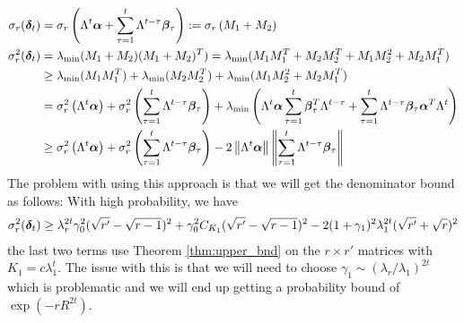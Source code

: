 \documentclass[10pt]{article}
\newcommand{\norm}[1]{\left\|#1\right\|}
\begin{document}
\begin{align*}
\sigma_r(\utcos_t) &= \sigma_r\left(\Lambda^t \ucos + \sum_{\tau=1}^t \Lambda^{t-\tau} \wcos_\tau\right) := \sigma_r\left(M_1 + M_2\right) \\
\sigma_r^2 (\utcos_t)&= \lambda_{\min}(M_1 + M_2)(M_1 + M_2)^T) = \lambda_{\min}(M_1 M_1^T + M_2 M_2^T + M_1 M_2^2 + M_2 M_1^T) \\
&\geq \lambda_{\min}(M_1 M_1^T)  + \lambda_{\min}(M_2 M_2^T) + \lambda_{\min}(M_1 M_2^2 + M_2 M_1^T) \\
& = \sigma_r^2\left( \Lambda^t \ucos \right) + \sigma_r^2\left( \sum_{\tau=1}^t \Lambda^{t-\tau} \wcos_\tau \right) + \lambda_{\min} \left( \Lambda^t \ucos \sum_{\tau=1}^t \wcos_\tau^T \Lambda^{t-\tau} + \sum_{\tau=1}^t \Lambda^{t-\tau} \wcos_\tau \ucos^T \Lambda^t \right) \\
& \geq \sigma_r^2\left( \Lambda^t \ucos \right) + \sigma_r^2\left( \sum_{\tau=1}^t \Lambda^{t-\tau} \wcos_\tau \right) - 2 \norm{\Lambda^t \ucos}\norm{\sum_{\tau=1}^t \Lambda^{t-\tau} \wcos_\tau} 
\end{align*}
The problem with using this approach is that we will get the denominator bound as follows: With high probability, we have
\begin{align*}
\sigma_r^2(\bm{\delta}_t) \geq \lambda_r^{2t} \gamma_0^2 (\sqrt{r'} - \sqrt{r-1})^2 + \gamma_0^2 C_{K_1} (\sqrt{r'} - \sqrt{r-1})^2 - 2  (1+\gamma_1)^2 \lambda_1^{2t} (\sqrt{r'} + \sqrt{r})^2
\end{align*}
the last two terms use Theorem \ref{thm:upper_bnd} on the $r \times r'$ matrices with $K_1 = c \lambda_1^t$. The issue with this is that we will need to choose $\gamma_1 \sim (\lambda_r/\lambda_1)^{2t}$ which is problematic and we will end up getting a probability bound of $\exp(-r R^{2t})$.

\end{document}
